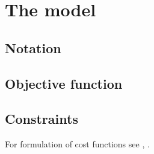 \section{The model}

\subsection{Notation}

\subsection{Objective function}

\subsection{Constraints}

For formulation of cost functions see \cite{Bergman1995}, \cite{Pineau2003}.	